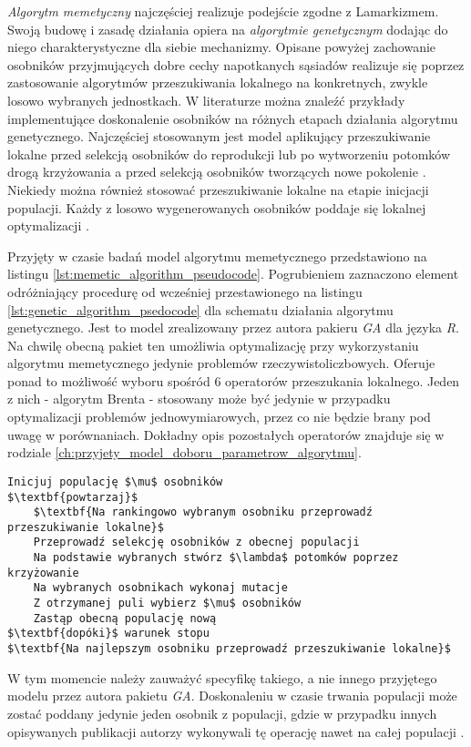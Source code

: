 \emph{Algorytm memetyczny} najczęściej realizuje podejście zgodne z Lamarkizmem. Swoją budowę i zasadę działania opiera na \emph{algorytmie genetycznym} dodając do niego charakterystyczne dla siebie mechanizmy. Opisane powyżej zachowanie osobników przyjmujących dobre cechy napotkanych sąsiadów realizuje się poprzez zastosowanie algorytmów przeszukiwania lokalnego na konkretnych, zwykle losowo wybranych jednostkach. W literaturze można znaleźć przykłady implementujące doskonalenie osobników na różnych etapach działania algorytmu genetycznego. Najczęściej stosowanym jest model aplikujący przeszukiwanie lokalne przed selekcją osobników do reprodukcji \cite{maringer2006portfolio} lub po wytworzeniu potomków drogą krzyżowania a przed selekcją osobników tworzących nowe pokolenie \cite{sudholt2008computational}. Niekiedy można również stosować przeszukiwanie lokalne na etapie inicjacji populacji. Każdy z losowo wygenerowanych osobników poddaje się lokalnej optymalizacji \cite{elbeltagi2005comparison}.
\par
Przyjęty w czasie badań model algorytmu memetycznego przedstawiono na listingu \ref{lst:memetic_algorithm_pseudocode}. Pogrubieniem zaznaczono element odróżniający procedurę od wcześniej przestawionego na listingu \ref{lst:genetic_algorithm_psedocode} dla schematu działania algorytmu genetycznego. Jest to model zrealizowany przez autora pakieru \emph{GA} dla języka \emph{R}. Na chwilę obecną pakiet ten umożliwia optymalizację przy wykorzystaniu algorytmu memetycznego jedynie problemów rzeczywistoliczbowych. Oferuje ponad to możliwość wyboru spośród 6 operatorów przeszukania lokalnego. Jeden z nich - algorytm Brenta - stosowany może być jedynie w przypadku optymalizacji problemów jednowymiarowych, przez co nie będzie brany pod uwagę w porównaniach. Dokładny opis pozostałych operatorów znajduje się w rodziale \ref{ch:przyjety_model_doboru_parametrow_algorytmu}.  
\begin{lstlisting}[caption=Model algorytmu memetycznego stosowany w pakiecie \emph{GA}, label=lst:memetic_algorithm_pseudocode, mathescape]
Inicjuj populację $\mu$ osobników
$\textbf{powtarzaj}$
    $\textbf{Na rankingowo wybranym osobniku przeprowadź przeszukiwanie lokalne}$
    Przeprowadź selekcję osobników z obecnej populacji
    Na podstawie wybranych stwórz $\lambda$ potomków poprzez krzyżowanie
    Na wybranych osobnikach wykonaj mutacje
    Z otrzymanej puli wybierz $\mu$ osobników
    Zastąp obecną populację nową
$\textbf{dopóki}$ warunek stopu
$\textbf{Na najlepszym osobniku przeprowadź przeszukiwanie lokalne}$
\end{lstlisting}
\par
W tym momencie należy zauważyć specyfikę takiego, a nie innego przyjętego modelu przez autora pakietu \emph{GA}. Doskonaleniu w czasie trwania populacji może zostać poddany jedynie jeden osobnik z populacji, gdzie w przypadku innych opisywanych publikacji autorzy wykonywali tę operację nawet na całej populacji \cite{elbeltagi2005comparison}\cite{sudholt2008computational}\cite{ong2006classification}.

